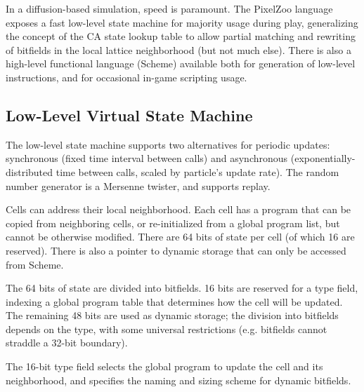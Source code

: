 \documentclass{acm_proc_article-sp}
\begin{document}
In a diffusion-based simulation, speed is paramount.
The PixelZoo language exposes a fast low-level state machine for majority usage during play,
generalizing the concept of the CA state lookup table to allow partial matching
and rewriting of bitfields in the local lattice neighborhood (but not much else).
There is also a high-level functional language (Scheme) available both for generation of low-level instructions,
and for occasional in-game scripting usage.

\subsection{Low-Level Virtual State Machine}

The low-level state machine supports two alternatives for periodic updates:
synchronous (fixed time interval between calls)
and asynchronous (exponentially-distributed time between calls, scaled by particle's update rate).
The random number generator is a Mersenne twister, and supports replay.

Cells can address their local neighborhood.
Each cell has a program that can be copied from neighboring cells, or re-initialized from a global program list,
but cannot be otherwise modified.
There are 64 bits of state per cell (of which 16 are reserved).
There is also a pointer to dynamic storage that can only be accessed from Scheme.

The 64 bits of state are divided into bitfields.
16 bits are reserved for a type field, indexing a global program table that determines how the cell will be updated.
The remaining 48 bits are used as dynamic storage; the division into bitfields depends on the type,
with some universal restrictions (e.g. bitfields cannot straddle a 32-bit boundary).

The 16-bit type field selects the global program to update the cell and its neighborhood,
and specifies the naming and sizing scheme for dynamic bitfields.
\end{document}
